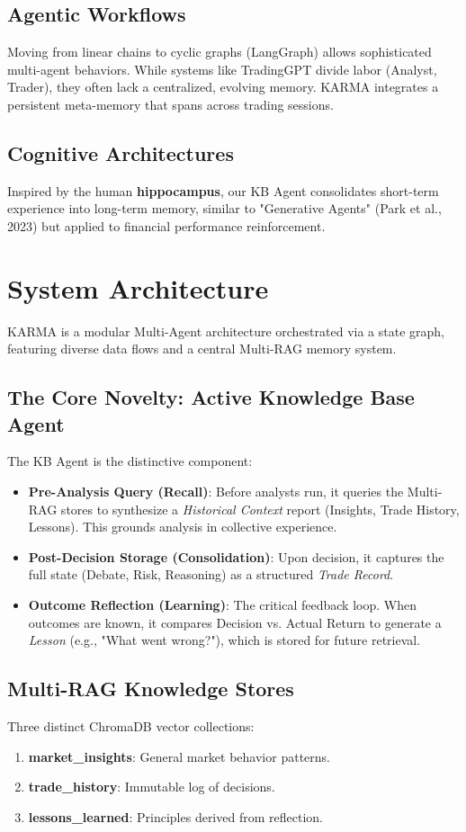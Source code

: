 \documentclass[11pt, a4paper]{article}
\begin{document}
\subsection{Agentic Workflows}
Moving from linear chains to cyclic graphs (LangGraph) allows sophisticated multi-agent behaviors. While systems like TradingGPT divide labor (Analyst, Trader), they often lack a centralized, evolving memory. KARMA integrates a persistent meta-memory that spans across trading sessions.

\subsection{Cognitive Architectures}
Inspired by the human \textbf{hippocampus}, our KB Agent consolidates short-term experience into long-term memory, similar to "Generative Agents" (Park et al., 2023) but applied to financial performance reinforcement.

\section{System Architecture}

KARMA is a modular Multi-Agent architecture orchestrated via a state graph, featuring diverse data flows and a central Multi-RAG memory system.

\subsection{The Core Novelty: Active Knowledge Base Agent}
The KB Agent is the distinctive component:
\begin{itemize}
    \item \textbf{Pre-Analysis Query (Recall)}: Before analysts run, it queries the Multi-RAG stores to synthesize a \textit{Historical Context} report (Insights, Trade History, Lessons). This grounds analysis in collective experience.
    \item \textbf{Post-Decision Storage (Consolidation)}: Upon decision, it captures the full state (Debate, Risk, Reasoning) as a structured \textit{Trade Record}.
    \item \textbf{Outcome Reflection (Learning)}: The critical feedback loop. When outcomes are known, it compares Decision vs. Actual Return to generate a \textit{Lesson} (e.g., "What went wrong?"), which is stored for future retrieval.
\end{itemize}

\subsection{Multi-RAG Knowledge Stores}
Three distinct ChromaDB vector collections:
\begin{enumerate}
    \item \textbf{market\_insights}: General market behavior patterns.
    \item \textbf{trade\_history}: Immutable log of decisions.
    \item \textbf{lessons\_learned}: Principles derived from reflection.
\end{enumerate}
\end{document}
